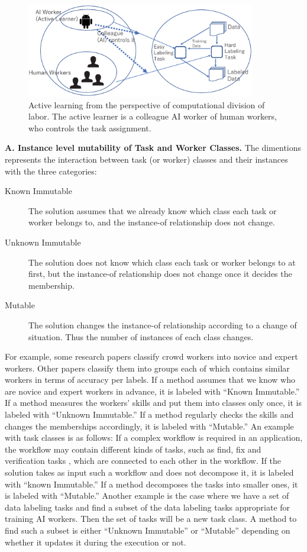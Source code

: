 \begin{figure}[t]
    \centering
    \includegraphics[width=100mm]{submissions/morishima/figures/dol-example2.eps}
    \caption{Active learning from the perspective of computational division of labor. The active learner is a colleague AI worker of human workers, who  controls the task assignment.}
    \label{fig:activelearning}
\end{figure}

\noindent
{\bf A. Instance level mutability of Task and Worker Classes.}
The dimentions represents the interaction between task (or worker) classes and their instances with  the three categories:

\begin{description}
\item[Known Immutable] The solution assumes that we already know which class each task or worker belongs to, and the instance-of relationship does not change.
\item[Unknown Immutable] The solution does not know which class each task or worker belongs to at first, but the instance-of relationship does not change once it decides the membership.
\item[Mutable] The solution changes the instance-of relationship according to a change of situation. Thus the number of instances of each class changes.
\end{description}

For example, some research papers classify crowd workers into novice and expert workers.
Other papers classify them into groups each of which contains similar workers in terms of accuracy per labels.
If a method assumes that we know who are  novice and expert workers in advance, it is labeled with ``Known Immutable.'' If a method measures the workers' skills and put them into classes only once, it is labeled with ``Unknown Immutable.'' If a method regularly checks the skills and changes the memberships accordingly, it is labeled with ``Mutable.''
An example with task classes is as follows: If a complex workflow is required in an application, the workflow may contain different kinds of tasks, such as find, fix  and  verification tasks  \cite{BLM+10}, which are connected to each other in the workflow.
If the solution takes as input such a workflow and does not decompose it, it is labeled with ``known Immutable.'' If a method decomposes the tasks into smaller ones, it is labeled with ``Mutable.''
Another example is the case where we have a set of data labeling tasks  and find a subset of the data labeling tasks  appropriate for training AI workers. Then the set of tasks will be a new task class. A method to find such a subset is either ``Unknown Immutable'' or ``Mutable'' depending on whether it updates it during the execution or not.\\

